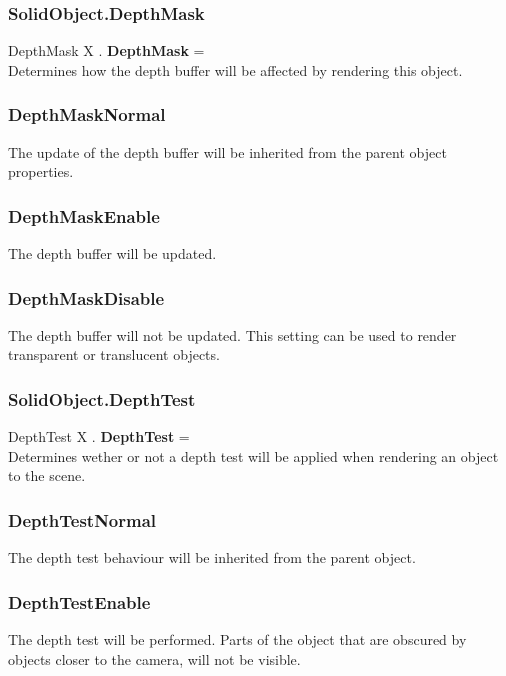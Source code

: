 \documentclass[10pt]{book}
\begin{document}
\subsubsection{SolidObject.DepthMask \label{F:SolidObject:DepthMask}}
DepthMask X . \textbf{DepthMask} = \\
Determines how the depth buffer will be affected by rendering this object.

\subsubsection{DepthMaskNormal \label{T:DepthMask|DepthMaskNormal}}
The update of the depth buffer will be inherited from the parent object properties.

\subsubsection{DepthMaskEnable \label{T:DepthMask|DepthMaskEnable}}
The depth buffer will be updated.

\subsubsection{DepthMaskDisable \label{T:DepthMask|DepthMaskDisable}}
The depth buffer will not be updated. This setting can be used to render transparent or translucent objects.

\subsubsection{SolidObject.DepthTest \label{F:SolidObject:DepthTest}}
DepthTest X . \textbf{DepthTest} = \\
Determines wether or not a depth test will be applied when rendering an object to the scene.

\subsubsection{DepthTestNormal \label{T:DepthTest|DepthTestNormal}}
The depth test behaviour will be inherited from the parent object.

\subsubsection{DepthTestEnable \label{T:DepthTest|DepthTestEnable}}
The depth test will be performed. Parts of the object that are obscured by objects closer to the camera, will not be visible.
\end{document}
